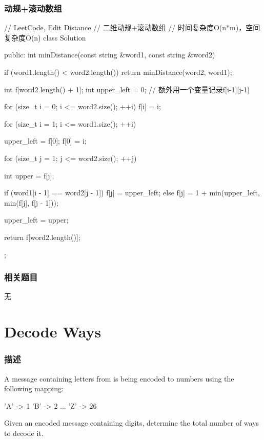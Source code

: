 \subsubsection{动规+滚动数组}
\begin{Code}
// LeetCode, Edit Distance
// 二维动规+滚动数组
// 时间复杂度O(n*m)，空间复杂度O(n)
class Solution {
public:
    int minDistance(const string &word1, const string &word2) {
        if (word1.length() < word2.length())
            return minDistance(word2, word1);

        int f[word2.length() + 1];
        int upper_left = 0; // 额外用一个变量记录f[i-1][j-1]

        for (size_t i = 0; i <= word2.size(); ++i)
            f[i] = i;

        for (size_t i = 1; i <= word1.size(); ++i) {
            upper_left = f[0];
            f[0] = i;

            for (size_t j = 1; j <= word2.size(); ++j) {
                int upper = f[j];

                if (word1[i - 1] == word2[j - 1])
                    f[j] = upper_left;
                else
                    f[j] = 1 + min(upper_left, min(f[j], f[j - 1]));

                upper_left = upper;
            }
        }

        return f[word2.length()];
    }
};
\end{Code}


\subsubsection{相关题目}
\begindot
\item 无
\myenddot


\section{Decode Ways} %
\label{sec:decode-ways}


\subsubsection{描述}
A message containing letters from  is being encoded to numbers using the following mapping:
\begin{Code}
'A' -> 1
'B' -> 2
...
'Z' -> 26
\end{Code}

Given an encoded message containing digits, determine the total number of ways to decode it.

